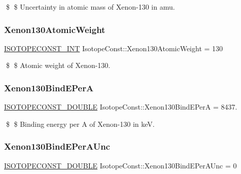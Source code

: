 \$ \$ Uncertainty in atomic mass of Xenon-\/130 in amu. \mbox{\label{group___isotope_const-_xenon-_xe130_ga55910dca858ce0fda7a6dcb129e7b866}} 
\subsubsection{\texorpdfstring{Xenon130\+Atomic\+Weight}{Xenon130AtomicWeight}}
{\footnotesize\ttfamily \mbox{\hyperlink{group___isotope_const-_macros_ga5f18360b3e99483a35c32d789e62621c}{I\+S\+O\+T\+O\+P\+E\+C\+O\+N\+S\+T\+\_\+\+I\+NT}} Isotope\+Const\+::\+Xenon130\+Atomic\+Weight = 130}

\$ \$ Atomic weight of Xenon-\/130. \mbox{\label{group___isotope_const-_xenon-_xe130_ga15d8f2e4a995058588e6d47825a6082e}} 
\subsubsection{\texorpdfstring{Xenon130\+Bind\+E\+PerA}{Xenon130BindEPerA}}
{\footnotesize\ttfamily \mbox{\hyperlink{group___isotope_const-_macros_ga8f45a7272ce02c0b4c65c44636ed719a}{I\+S\+O\+T\+O\+P\+E\+C\+O\+N\+S\+T\+\_\+\+D\+O\+U\+B\+LE}} Isotope\+Const\+::\+Xenon130\+Bind\+E\+PerA = 8437.}

\$ \$ Binding energy per A of Xenon-\/130 in keV. \mbox{\label{group___isotope_const-_xenon-_xe130_gaef9f30c4e7c784ec15ae745352a1e38a}} 
\subsubsection{\texorpdfstring{Xenon130\+Bind\+E\+Per\+A\+Unc}{Xenon130BindEPerAUnc}}
{\footnotesize\ttfamily \mbox{\hyperlink{group___isotope_const-_macros_ga8f45a7272ce02c0b4c65c44636ed719a}{I\+S\+O\+T\+O\+P\+E\+C\+O\+N\+S\+T\+\_\+\+D\+O\+U\+B\+LE}} Isotope\+Const\+::\+Xenon130\+Bind\+E\+Per\+A\+Unc = 0}


